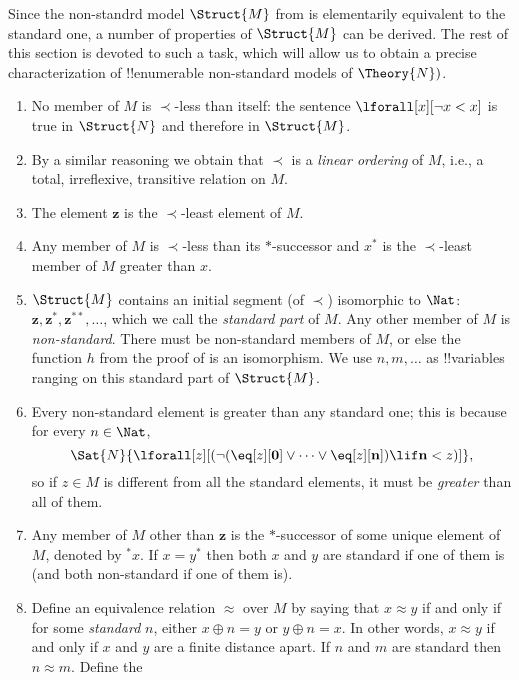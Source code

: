 \documentclass[../../include/open-logic-section]{subfiles}
\begin{document}
Since the non-standrd model $\Struct{M}$ from  is
elementarily equivalent to the standard one, a number of properties of
$\Struct{M}$ can be derived. The rest of this section is devoted to
such a task, which will allow us to obtain a precise characterization
of !!{enumerable} non-standard models of $\Theory{N})$.


\begin{enumerate}
\item No member of $M$ is $\prec$-less than itself: the sentence
  $\lforall[x][\lnot x < x]$ is true in $\Struct{N}$ and therefore in
  $\Struct{M}$.
\item By a similar reasoning we obtain that $\prec$ is a \emph{linear
    ordering} of $M$, i.e., a total, irreflexive, transitive relation
  on $M$. 
\item The element $\mathbf{z}$ is the $\prec$-least element of $M$.
\item Any member of $M$ is $\prec$-less than its $*$-successor and
  $x^*$ is the $\prec$-least member of $M$ greater than $x$.
\item $\Struct{M}$ contains an initial segment (of $\prec$)
  isomorphic to $\Nat$: $\mathbf{z}, \mathbf{z}^*,
  \mathbf{z}^{**}, \dots$, which we call the \emph{standard part} of
  $M$. Any other member of $M$ is \emph{non-standard}. There must be
  non-standard members of $M$, or else the function $h$ from
  the proof of  is an isomorphism.  We use
  $n, m, \dots$ as !!{variable}s ranging on this standard part of
  $\Struct{M}$.
\item Every non-standard element is greater than any standard one;
  this is because for every $n \in \Nat$,
  \[
  \Sat{N}{\lforall[z][(\lnot(\eq[z][\mathbf{0}] \lor
  \dots \lor \eq[z][\mathbf{n}]) \lif \mathbf{n} < z)]},
  \]
  so if $z \in M$ is different from all the standard elements, it must
  be \emph{greater} than all of them. 
\item Any member of $M$ other than $\mathbf{z}$ is the $*$-successor
  of some unique element of $M$, denoted by $^*x$. If $x = y^*$ then
  both $x$ and $y$ are standard if one of them is (and both
  non-standard if one of them is).
\item Define an equivalence relation $\approx$ over $M$ by saying
  that $x \approx y$ if and only if for some \emph{standard} $n$,
  either $x \oplus n = y$ or $y \oplus n =x$. In other words, $x
  \approx y$ if and only if $x$ and $y$ are a finite distance
  apart. If $n$ and $m$ are standard then $n \approx m$. Define the

\end{enumerate}
\end{document}
